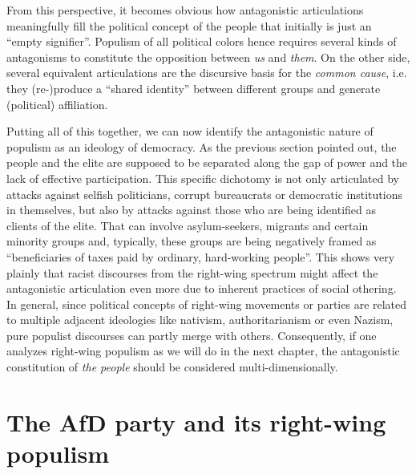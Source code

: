 \documentclass[a4paper]{scrreprt}
\begin{document}
From this perspective, it becomes obvious how antagonistic articulations meaningfully fill the political concept of the people that initially is just an ``empty signifier''. \cite[p.~72]{laclau:2005} Populism of all political colors hence requires several kinds of antagonisms to constitute the opposition between {\em us} and {\em them}. On the other side, several equivalent articulations are the discursive basis for the {\em common cause}, i.e. they (re-)produce a ``shared identity'' between different groups and generate (political) affiliation. \cite[p.~9]{mudde:2017}\par
Putting all of this together, we can now identify the antagonistic nature of populism as an ideology of democracy. As the previous section pointed out, the people and the elite are supposed to be separated along the gap of power and the lack of effective participation. This specific dichotomy is not only articulated by attacks against selfish politicians, corrupt bureaucrats or democratic institutions in themselves, but also by attacks against those who are being identified as clients of the elite. That can involve asylum-seekers, migrants and certain minority groups and, typically, these groups are being negatively framed as ``beneficiaries of taxes paid by ordinary, hard-working people''. \cite[p.~32]{canovan:2002} This shows very plainly that racist discourses from the right-wing spectrum might affect the antagonistic articulation even more due to inherent practices of social othering. In general, since political concepts of right-wing movements or parties are related to multiple adjacent ideologies like nativism, authoritarianism or even Nazism, pure populist discourses can partly merge with others. Consequently, if one analyzes right-wing populism as we will do in the next chapter, the antagonistic constitution of {\em the people} should be considered multi-dimensionally.
\chapter{The AfD party and its right-wing populism}
\end{document}
